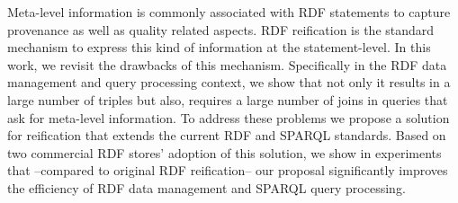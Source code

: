 Meta-level information is commonly associated with RDF statements to capture provenance as well as quality related aspects. RDF reification is the standard mechanism to express this kind of information at the statement-level. In this work, we revisit the drawbacks of this mechanism. Specifically in the RDF data management and query processing context, we show that not only it results in a large number of triples but also, requires a large number of joins in queries that ask for meta-level information. To address these problems we propose a solution for reification that extends the current RDF and SPARQL standards. Based on two commercial RDF stores' adoption of this solution, we show in experiments that --compared to original RDF reification-- our proposal significantly improves the efficiency of RDF data management and SPARQL query processing.